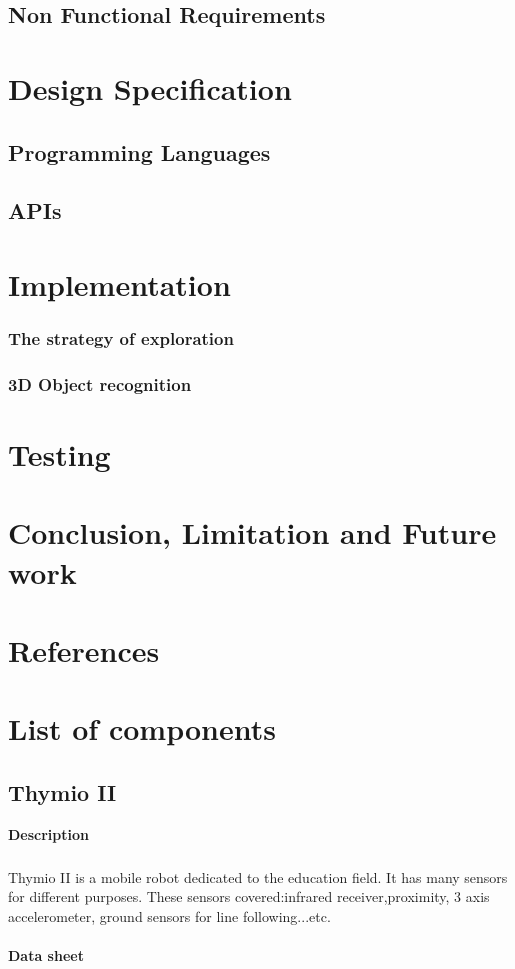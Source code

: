 \documentclass[12pt]{report}
\begin{document}
\section{Non Functional Requirements}
\chapter{Design Specification}
\section{Programming Languages}
\section{APIs}
\chapter{Implementation}
\subsection{The strategy of exploration}
\subsection{3D Object recognition}

\chapter{Testing}
\chapter{Conclusion, Limitation and Future work}
\chapter{References}
\appendix
\chapter{List of components}
\section{Thymio II}
\textbf{Description} 
\paragraph{}
Thymio II is a mobile robot dedicated to the education field. It has many sensors for different purposes. These sensors covered:infrared receiver,proximity, 3 axis accelerometer, ground sensors for line following...etc.
\\ \\
\textbf{Data sheet} 
\end{document}
